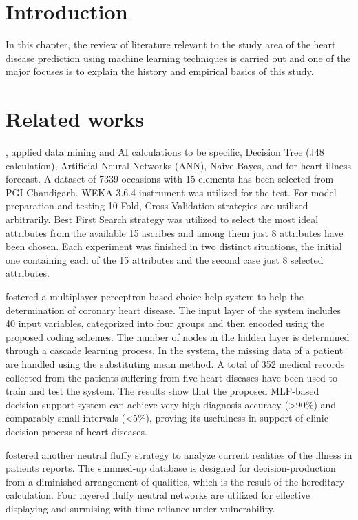 \section{Introduction}
In this chapter, the review of literature relevant to the study area of the heart disease prediction using machine learning techniques is carried out and one of the major focuses is to explain the history and empirical basics of this study.

\section{Related works}{
\setlength{\parskip}{1em}

\citealp{taneja2013heart}, applied data mining and AI calculations to be specific, Decision Tree (J48 calculation), Artificial Neural Networks (ANN), Naive Bayes, and for heart illness forecast. A dataset of 7339 occasions with 15 elements has been selected from PGI Chandigarh. WEKA 3.6.4 instrument was utilized for the test. For model preparation and testing 10-Fold, Cross-Validation strategies are utilized arbitrarily. Best First Search strategy was utilized to select the most ideal attributes from the available 15 ascribes and among them just 8 attributes have been chosen. Each experiment was finished in two distinct situations, the initial one containing each of the 15 attributes and the second case just 8 selected attributes.

\citealp{yan2006multilayer} fostered a multiplayer perceptron-based choice help system to help the determination of coronary heart disease. The input layer of the system includes 40 input variables, categorized into four groups and then encoded using the proposed coding schemes. The number of nodes in the hidden layer is determined through a cascade learning process. In the system, the missing data of a patient are handled using the substituting mean method. A total of 352 medical records collected from the patients suffering from five heart diseases have been used to train and test the system. The results show that the proposed MLP-based decision support system can achieve very high diagnosis accuracy (>90\%) and comparably small intervals (<5\%), proving its usefulness in support of clinic decision process of heart diseases.

\citealp{setthukkarase2012intelligent} fostered another neutral fluffy strategy to analyze current realities of the illness in patients reports. The summed-up database is designed for decision-production from a diminished arrangement of qualities, which is the result of the hereditary calculation. Four layered fluffy neutral networks are utilized for effective displaying and surmising with time reliance under vulnerability.

}
